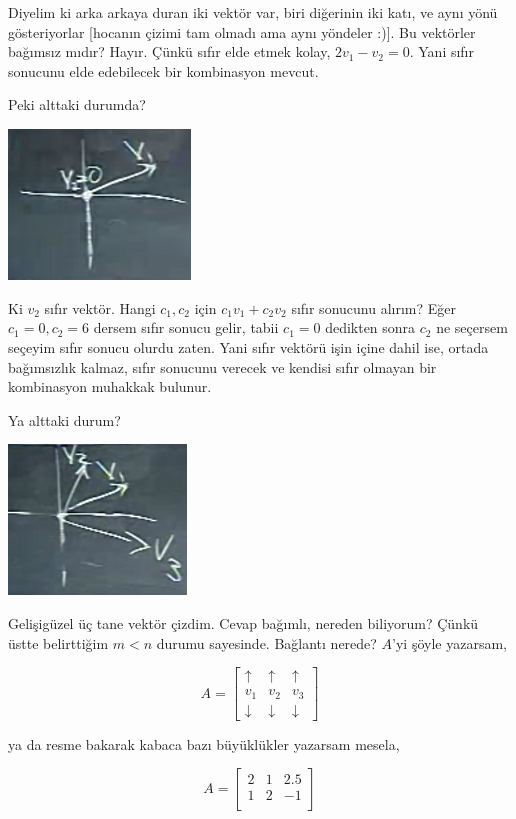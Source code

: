 \documentclass[12pt,fleqn]{article}\usepackage{../../common}
\begin{document}
Diyelim ki arka arkaya duran iki vektör var, biri diğerinin iki katı, ve
aynı yönü gösteriyorlar [hocanın çizimi tam olmadı ama aynı yöndeler
:)]. Bu vektörler bağımsız mıdır? Hayır. Çünkü sıfır elde etmek kolay,
$2v_1 - v_2 = 0$. Yani sıfır sonucunu elde edebilecek bir kombinasyon
mevcut. 

Peki alttaki durumda?

\includegraphics[height=4cm]{9_02.png}

Ki $v_2$ sıfır vektör. Hangi $c_1,c_2$ için $c_1v_1+c_2v_2$ sıfır sonucunu
alırım? Eğer $c_1=0,c_2=6$ dersem sıfır sonucu gelir, tabii $c_1=0$
dedikten sonra $c_2$ ne seçersem seçeyim sıfır sonucu olurdu zaten. Yani
sıfır vektörü işin içine dahil ise, ortada bağımsızlık kalmaz, sıfır
sonucunu verecek ve kendisi sıfır olmayan bir kombinasyon muhakkak
bulunur. 

Ya alttaki durum? 

\includegraphics[height=4cm]{9_03.png}

Gelişigüzel üç tane vektör çizdim. Cevap bağımlı, nereden biliyorum? Çünkü
üstte belirttiğim  $m < n$ durumu sayesinde. Bağlantı nerede? $A$'yi şöyle
yazarsam, 

$$ 
A = 
\left[\begin{array}{rrr}
\uparrow & \uparrow & \uparrow \\
v_1 & v_2 & v_3 \\
\downarrow & \downarrow & \downarrow 
\end{array}\right]
$$

ya da resme bakarak kabaca bazı büyüklükler yazarsam mesela, 

$$ 
A = 
\left[\begin{array}{rrr}
2 & 1 & 2.5 \\
1 & 2 & -1 \\
\end{array}\right]
$$
\end{document}
